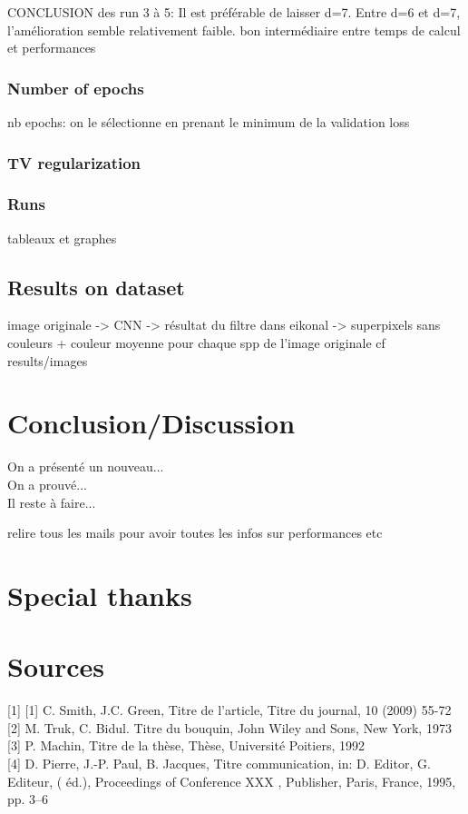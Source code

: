 \documentclass{article}
\begin{document}
        CONCLUSION des run 3 à 5: Il est préférable de laisser d=7. Entre d=6 et d=7, l'amélioration semble
        relativement faible.
        bon intermédiaire entre temps de calcul et performances

        \subsubsection{Number of epochs}
    nb epochs: on le sélectionne en prenant le minimum de la validation loss
        \subsubsection{TV regularization}

        \subsubsection{Runs}
        tableaux et graphes
    \subsection{Results on dataset}
    image originale -> CNN -> résultat du filtre dans eikonal -> superpixels sans couleurs + couleur moyenne pour chaque spp de l'image originale
    cf results/images











\section{Conclusion/Discussion}
On a présenté un nouveau...\\
On a prouvé...\\
Il reste à faire...

relire tous les mails pour avoir toutes les infos sur performances etc

\section*{Special thanks}

\section*{Sources}

\noindent
{[}1]
{[}1] C. Smith, J.C. Green, Titre de l’article, Titre du journal, 10 (2009) 55-72\\
{[}2] M. Truk, C. Bidul. Titre du bouquin, John Wiley and Sons, New York, 1973\\
{[}3] P. Machin, Titre de la thèse, Thèse, Université Poitiers, 1992\\
{[}4] D. Pierre, J.-P. Paul, B. Jacques, Titre communication, in: D. Editor, G. Editeur, ( éd.), Proceedings of Conference XXX , Publisher, Paris, France, 1995, pp. 3–6

\newpage
\end{document}
